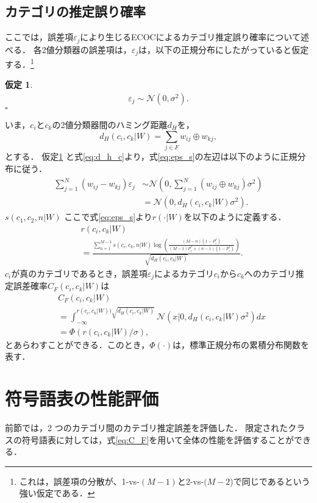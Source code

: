 \documentclass{jarticle}
\theoremstyle{definition}
\newtheorem{assumption}{仮定}
\def\QED{\hfill$\square$}
\begin{document}
\subsection{カテゴリの推定誤り確率}
ここでは，誤差項$\varepsilon_j$により生じるECOCによるカテゴリ推定誤り確率について述べる． 
各2値分類器の誤差項は，$\varepsilon_j$は，以下の正規分布にしたがっていると仮定する．\footnote{これは，誤差項の分散が、1-vs-$(M-1)$と2-vs-$(M-2$)で同じであるという強い仮定である．}
\begin{assumption}\label{ass:eps}
\begin{align}
    \varepsilon_j \sim \mathcal{N}(0,\sigma^2).
\end{align}
\QED \end{assumption} 
いま，$c_i$と$c_k$の2値分類器間のハミング距離$d_H$を，
\begin{equation}\label{eq:d_h_c}
    d_H(c_i,c_k|W) = \sum_{j \in F} w_{ij} \oplus w_{kj},
\end{equation}
とする．
仮定\ref{ass:eps} と式\eqref{eq:d_h_c}より，式\eqref{eq:eps_s}の左辺は以下のように正規分布に従う．
\begin{align}
    \sum_{j = 1}^N (w_{ij} - w_{kj})\varepsilon_j &\sim \mathcal{N}(0,\sum_{j = 1}^N (w_{ij} \oplus w_{kj})\sigma^2)\nonumber\\
    &=\mathcal{N}(0,d_H(c_i,c_k|W)\sigma^2).
\end{align}
$s(c_1,c_2,n|W)$
ここで式\eqref{eq:eps_s}より$r(\cdot|W)$を以下のように定義する．
\begin{align}\label{eq:def_r}
&r(c_i,c_k|W) \nonumber\\&= \frac{\sum_{n = 1}^{M - 1}s(c_i,c_k,n|W)\log\left(\frac{(M - n)(1-P^*_i)}{(M-1)P^*_i+(n-1)(1-P^*_i)}\right)}{\sqrt{d_H(c_i,c_k|W)}}.
\end{align}
$c_i$が真のカテゴリであるとき，誤差項$\varepsilon_j$によるカテゴリ$c_i$から$c_k$へのカテゴリ推定誤差確率$C_F(c_i,c_k|W)$は
\begin{align}\label{eq:C_F}
    &C_F(c_i,c_k|W) \\&= \int^{r(c_i,c_k|W))\sqrt{d_H(c_i,c_k|W)} }_{-\infty}\mathcal{N}(x|0,d_H(c_i,c_k|W)\sigma^2)dx\nonumber\\
&=\Phi(r(c_i,c_k|W)/\sigma),
\end{align}
とあらわすことができる．このとき，$\Phi(\cdot)$は，標準正規分布の累積分布関数を表す．

\section{符号語表の性能評価}
前節では，2 つのカテゴリ間のカテゴリ推定誤差を評価した．
限定されたクラスの符号語表に対しては，式\eqref{eq:C_F}を用いて全体の性能を評価することができる．
\end{document}
